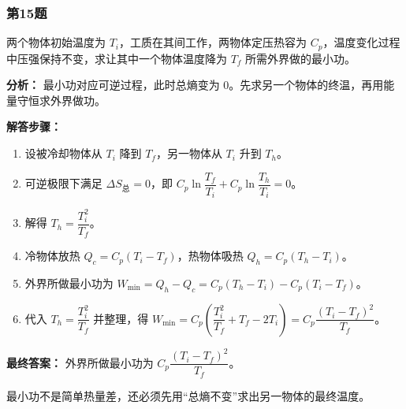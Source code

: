 \documentclass[12pt,a4paper]{ctexart}
\begin{document}
\subsubsection*{第15题}
\begin{tcolorbox}[colback=gray!2!white,colframe=black!60,title={题目}]
两个物体初始温度为 \(T_i\)，工质在其间工作，两物体定压热容为 \(C_p\)，温度变化过程中压强保持不变，求让其中一个物体温度降为 \(T_f\) 所需外界做的最小功。\par
\end{tcolorbox}
\begin{tcolorbox}[colback=blue!2!white,colframe=blue!55!black,title={完整答案}]
\textbf{分析：}
最小功对应可逆过程，此时总熵变为 0。先求另一个物体的终温，再用能量守恒求外界做功。\par
\textbf{解答步骤：}
\begin{enumerate}
\item 设被冷却物体从 \(T_i\) 降到 \(T_f\)，另一物体从 \(T_i\) 升到 \(T_h\)。
\item 可逆极限下满足 \(\Delta S_{\text{总}}=0\)，即 \(C_p\ln\dfrac{T_f}{T_i}+C_p\ln\dfrac{T_h}{T_i}=0\)。
\item 解得 \(T_h=\dfrac{T_i^2}{T_f}\)。
\item 冷物体放热 \(Q_c=C_p(T_i-T_f)\)，热物体吸热 \(Q_h=C_p(T_h-T_i)\)。
\item 外界所做最小功为 \(W_{\min}=Q_h-Q_c=C_p(T_h-T_i)-C_p(T_i-T_f)\)。
\item 代入 \(T_h=\dfrac{T_i^2}{T_f}\) 并整理，得 \(W_{\min}=C_p\left(\dfrac{T_i^2}{T_f}+T_f-2T_i\right)=C_p\dfrac{(T_i-T_f)^2}{T_f}\)。
\end{enumerate}
\textbf{最终答案：}
外界所做最小功为 \(C_p\dfrac{(T_i-T_f)^2}{T_f}\)。\par
\end{tcolorbox}
\begin{tcolorbox}[colback=red!2!white,colframe=red!55!black,title={易错点}]
最小功不是简单热量差，还必须先用“总熵不变”求出另一物体的最终温度。\par
\end{tcolorbox}
\end{document}

